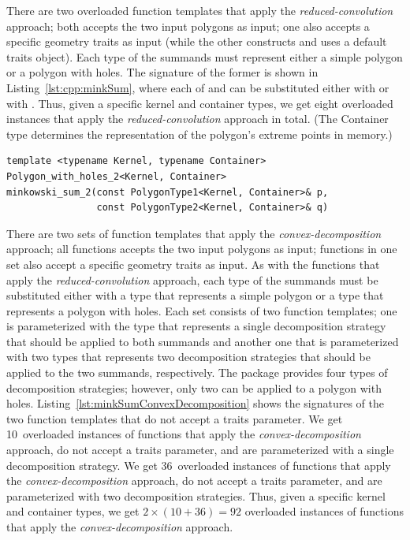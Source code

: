 There are two overloaded function templates
 that apply the
\emph{reduced-convolution} approach; both accepts the two input
polygons as input; one also accepts a specific geometry traits as
input (while the other constructs and uses a default traits
object). Each type of the summands must represent either a simple
polygon or a polygon with holes. The signature of the former is shown
in Listing~\ref{lst:cpp:minkSum}, where each of
 and  can be
substituted either with  or with
.
%
Thus, given a specific kernel and container types, we get eight
overloaded instances that apply the \emph{reduced-convolution}
approach in total. (The Container type determines the representation
of the polygon's extreme points in memory.)

\begin{lstfloat}
  \begin{lstlisting}[style=cppFramedStyle,basicstyle=\normalsize,
                     label={lst:cpp:minkSum},
                     caption={The signature of one of the \cppLstinline{CGAL::minkowski_sum_2} overloaded function templates.}]
template <typename Kernel, typename Container>
Polygon_with_holes_2<Kernel, Container>
minkowski_sum_2(const PolygonType1<Kernel, Container>& p,
                const PolygonType2<Kernel, Container>& q)
\end{lstlisting}
\end{lstfloat}

There are two sets of function templates
 that apply the
\emph{convex-decomposition} approach; all functions accepts the two
input polygons as input; functions in one set also accept a specific
geometry traits as input. As with the functions that apply the
\emph{reduced-convolution} approach, each type of the summands must be
substituted either with a type that represents a simple polygon or a
type that represents a polygon with holes. Each set consists of two
function templates; one is parameterized with the type that represents
a single decomposition strategy that should be applied to both
summands and another one that is parameterized with two types that
represents two decomposition strategies that should be applied to the
two summands, respectively. The package provides four types of
decomposition strategies; however, only two can be applied to a polygon
with holes. Listing~\ref{lst:minkSumConvexDecomposition} shows the
signatures of the two function templates that do not accept a traits
parameter.
%
We get 10~overloaded instances of functions that apply the
\emph{convex-decomposition} approach, do not accept a traits
parameter, and are parameterized with a single decomposition
strategy. We get 36~overloaded instances of functions that apply the
\emph{convex-decomposition} approach, do not accept a traits
parameter, and are parameterized with two decomposition
strategies. Thus, given a specific kernel and container types, we get
$2 \times (10 + 36) = 92$ overloaded instances of functions that apply
the \emph{convex-decomposition} approach.

